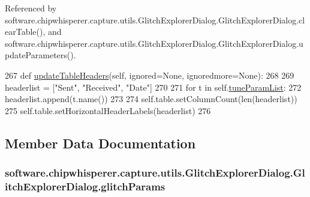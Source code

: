 Referenced by software.\+chipwhisperer.\+capture.\+utils.\+Glitch\+Explorer\+Dialog.\+Glitch\+Explorer\+Dialog.\+clear\+Table(), and software.\+chipwhisperer.\+capture.\+utils.\+Glitch\+Explorer\+Dialog.\+Glitch\+Explorer\+Dialog.\+update\+Parameters().


\begin{DoxyCode}
267     \textcolor{keyword}{def }\hyperlink{classsoftware_1_1chipwhisperer_1_1capture_1_1utils_1_1GlitchExplorerDialog_1_1GlitchExplorerDialog_a19aa7b1ddaec5a1bed3603b3c6bb8f79}{updateTableHeaders}(self, ignored=None, ignoredmore=None):
268 
269         headerlist = [\textcolor{stringliteral}{"Sent"}, \textcolor{stringliteral}{"Received"}, \textcolor{stringliteral}{"Date"}]
270 
271         \textcolor{keywordflow}{for} t \textcolor{keywordflow}{in} self.\hyperlink{classsoftware_1_1chipwhisperer_1_1capture_1_1utils_1_1GlitchExplorerDialog_1_1GlitchExplorerDialog_adc4bbdddb1abd11ae9e8856f079592c3}{tuneParamList}:
272             headerlist.append(t.name())
273 
274         self.table.setColumnCount(len(headerlist))
275         self.table.setHorizontalHeaderLabels(headerlist)
276 
\end{DoxyCode}


\subsection{Member Data Documentation}
\hypertarget{classsoftware_1_1chipwhisperer_1_1capture_1_1utils_1_1GlitchExplorerDialog_1_1GlitchExplorerDialog_aa83284eba0a7468837d2bc05433de5d8}{}
\subsubsection[{glitch\+Params}]{\setlength{\rightskip}{0pt plus 5cm}software.\+chipwhisperer.\+capture.\+utils.\+Glitch\+Explorer\+Dialog.\+Glitch\+Explorer\+Dialog.\+glitch\+Params}\label{classsoftware_1_1chipwhisperer_1_1capture_1_1utils_1_1GlitchExplorerDialog_1_1GlitchExplorerDialog_aa83284eba0a7468837d2bc05433de5d8}
\hypertarget{classsoftware_1_1chipwhisperer_1_1capture_1_1utils_1_1GlitchExplorerDialog_1_1GlitchExplorerDialog_a25e6f4209025c52a221713ef8b4bb329}{}
